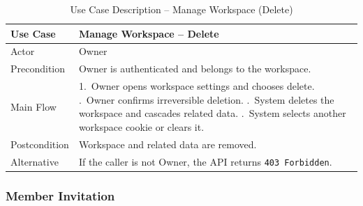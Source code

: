 \documentclass[12pt,a4paper]{report}
\newcommand{\reporttablesetup}{%
  \small%
  \setlength{\tabcolsep}{5pt}%
  \renewcommand{\arraystretch}{1.22}%
  \arrayrulecolor{framegray}%
}
\begin{document}
\begin{table}[H]
  \centering
  \reporttablesetup
  \begin{tabularx}{\textwidth}{|p{3.1cm}|Y|}
    \hline
    Use Case     & Manage Workspace -- Delete \\
    \hline
    Actor        & Owner \\
    \hline
    Precondition & Owner is authenticated and belongs to the workspace. \\
    \hline
    Main Flow    & 1.\ Owner opens workspace settings and chooses delete. .\ Owner confirms irreversible deletion. .\ System deletes the workspace and cascades related data. .\ System selects another workspace cookie or clears it. \\
    \hline
    Postcondition & Workspace and related data are removed. \\
    \hline
    Alternative  & If the caller is not Owner, the API returns \texttt{403 Forbidden}.
    \\
    \hline
  \end{tabularx}
  \caption{Use Case Description -- Manage Workspace (Delete)}
  \label{tab:uc02b}
\end{table}

\subsubsection{Member Invitation}
\end{document}
